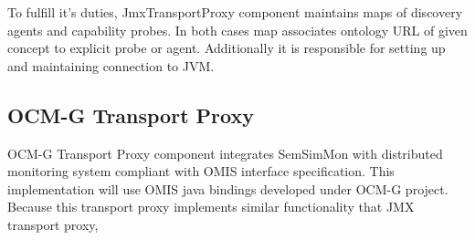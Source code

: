 To fulfill it's duties, JmxTransportProxy component maintains maps of discovery agents and capability probes. In both
cases map associates ontology URL of given concept to explicit probe or agent. Additionally it is responsible for
setting up and maintaining connection to JVM.


\subsection{OCM-G Transport Proxy}

OCM-G Transport Proxy component integrates SemSimMon with distributed monitoring system compliant with OMIS interface
specification. This implementation will use OMIS java bindings developed under OCM-G project. Because this transport
proxy implements similar functionality that JMX transport proxy, 


